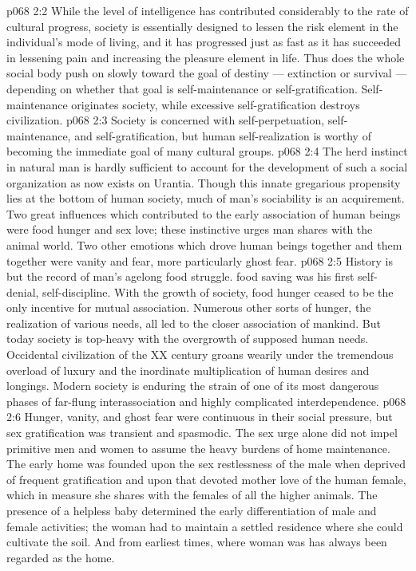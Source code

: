 \vs p068 2:2 While the level of intelligence has contributed considerably to the rate of cultural progress, society is essentially designed to lessen the risk element in the individual’s mode of living, and it has progressed just as fast as it has succeeded in lessening pain and increasing the pleasure element in life. Thus does the whole social body push on slowly toward the goal of destiny --- extinction or survival --- depending on whether that goal is self\hyp{}maintenance or self\hyp{}gratification. Self\hyp{}maintenance originates society, while excessive self\hyp{}gratification destroys civilization.
\vs p068 2:3 Society is concerned with self\hyp{}perpetuation, self\hyp{}maintenance, and self\hyp{}gratification, but human self\hyp{}realization is worthy of becoming the immediate goal of many cultural groups.
\vs p068 2:4 The herd instinct in natural man is hardly sufficient to account for the development of such a social organization as now exists on Urantia. Though this innate gregarious propensity lies at the bottom of human society, much of man’s sociability is an acquirement. Two great influences which contributed to the early association of human beings were food hunger and sex love; these instinctive urges man shares with the animal world. Two other emotions which drove human beings together and  them together were vanity and fear, more particularly ghost fear.
\vs p068 2:5 \pc History is but the record of man’s agelong food struggle.  food saving was his first self\hyp{}denial, self\hyp{}discipline. With the growth of society, food hunger ceased to be the only incentive for mutual association. Numerous other sorts of hunger, the realization of various needs, all led to the closer association of mankind. But today society is top\hyp{}heavy with the overgrowth of supposed human needs. Occidental civilization of the XX century groans wearily under the tremendous overload of luxury and the inordinate multiplication of human desires and longings. Modern society is enduring the strain of one of its most dangerous phases of far\hyp{}flung interassociation and highly complicated interdependence.
\vs p068 2:6 Hunger, vanity, and ghost fear were continuous in their social pressure, but sex gratification was transient and spasmodic. The sex urge alone did not impel primitive men and women to assume the heavy burdens of home maintenance. The early home was founded upon the sex restlessness of the male when deprived of frequent gratification and upon that devoted mother love of the human female, which in measure she shares with the females of all the higher animals. The presence of a helpless baby determined the early differentiation of male and female activities; the woman had to maintain a settled residence where she could cultivate the soil. And from earliest times, where woman was has always been regarded as the home.
